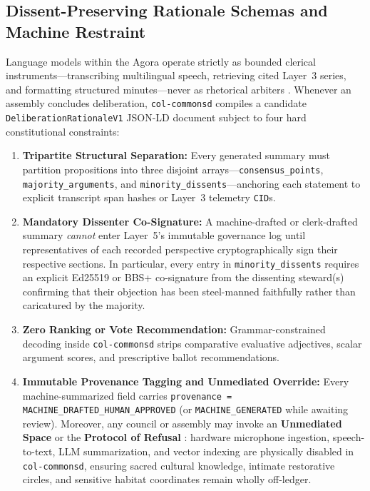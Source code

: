 \subsection{Dissent-Preserving Rationale Schemas and Machine Restraint}

Language models within the Agora operate strictly as bounded clerical instruments---transcribing multilingual speech, retrieving cited Layer~3 series, and formatting structured minutes---never as rhetorical arbiters \parencite{bender2021parrots}. Whenever an assembly concludes deliberation, \texttt{col-commonsd} compiles a candidate \texttt{DeliberationRationaleV1} JSON-LD document subject to four hard constitutional constraints:

\begin{enumerate}
  \item \textbf{Tripartite Structural Separation:} Every generated summary must partition propositions into three disjoint arrays---\texttt{consensus\_points}, \texttt{majority\_arguments}, and \texttt{minority\_dissents}---anchoring each statement to explicit transcript span hashes or Layer~3 telemetry \texttt{CID}s.
  \item \textbf{Mandatory Dissenter Co-Signature:} A machine-drafted or clerk-drafted summary \emph{cannot} enter Layer~5's immutable governance log until representatives of each recorded perspective cryptographically sign their respective sections. In particular, every entry in \texttt{minority\_dissents} requires an explicit Ed25519 or BBS+ co-signature from the dissenting steward(s) confirming that their objection has been steel-manned faithfully rather than caricatured by the majority.
  \item \textbf{Zero Ranking or Vote Recommendation:} Grammar-constrained decoding inside \texttt{col-commonsd} strips comparative evaluative adjectives, scalar argument scores, and prescriptive ballot recommendations.
  \item \textbf{Immutable Provenance Tagging and Unmediated Override:} Every machine-summarized field carries \texttt{provenance = MACHINE\_DRAFTED\_HUMAN\_APPROVED} (or \texttt{MACHINE\_GENERATED} while awaiting review). Moreover, any council or assembly may invoke an \textbf{Unmediated Space} or the \textbf{Protocol of Refusal} \parencite{hirschman1970,costanzachock2020design}: hardware microphone ingestion, speech-to-text, LLM summarization, and vector indexing are physically disabled in \texttt{col-commonsd}, ensuring sacred cultural knowledge, intimate restorative circles, and sensitive habitat coordinates remain wholly off-ledger.
\end{enumerate}


